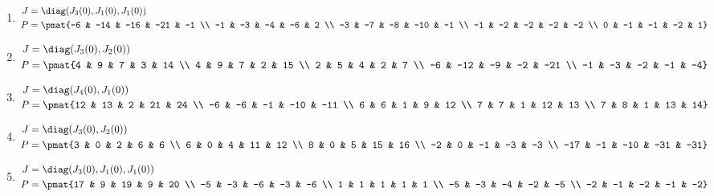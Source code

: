 \begin{enumerate}
\item

\begin{align*}
J &= \diag(J_{3}(0), J_{1}(0), J_{1}(0))\\
P &= \pmat{-6 & -14 & -16 & -21 & -1 \\ -1 & -3 & -4 & -6 & 2 \\ -3 & -7 & -8 & -10 & -1 \\ -1 & -2 & -2 & -2 & -2 \\ 0 & -1 & -1 & -2 & 1}
\end{align*}

\item

\begin{align*}
J &= \diag(J_{3}(0), J_{2}(0))\\
P &= \pmat{4 & 9 & 7 & 3 & 14 \\ 4 & 9 & 7 & 2 & 15 \\ 2 & 5 & 4 & 2 & 7 \\ -6 & -12 & -9 & -2 & -21 \\ -1 & -3 & -2 & -1 & -4}
\end{align*}

\item

\begin{align*}
J &= \diag(J_{4}(0), J_{1}(0))\\
P &= \pmat{12 & 13 & 2 & 21 & 24 \\ -6 & -6 & -1 & -10 & -11 \\ 6 & 6 & 1 & 9 & 12 \\ 7 & 7 & 1 & 12 & 13 \\ 7 & 8 & 1 & 13 & 14}
\end{align*}

\item

\begin{align*}
J &= \diag(J_{3}(0), J_{2}(0))\\
P &= \pmat{3 & 0 & 2 & 6 & 6 \\ 6 & 0 & 4 & 11 & 12 \\ 8 & 0 & 5 & 15 & 16 \\ -2 & 0 & -1 & -3 & -3 \\ -17 & -1 & -10 & -31 & -31}
\end{align*}

\item

\begin{align*}
J &= \diag(J_{3}(0), J_{1}(0), J_{1}(0))\\
P &= \pmat{17 & 9 & 19 & 9 & 20 \\ -5 & -3 & -6 & -3 & -6 \\ 1 & 1 & 1 & 1 & 1 \\ -5 & -3 & -4 & -2 & -5 \\ -2 & -1 & -2 & -1 & -2}
\end{align*}


\end{enumerate}
